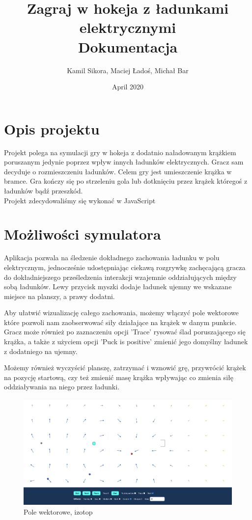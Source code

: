 \documentclass{article}
\title{ Zagraj w hokeja z ładunkami elektrycznymi \\
\large Dokumentacja}
\author{Kamil Sikora,
Maciej Ładoś,
Michał Bar}
\date{April 2020}
\begin{document}
\maketitle

\newpage
\tableofcontents

\newpage

\section{Opis projektu}
Projekt polega na symulacji gry w hokeja z dodatnio naładowanym krążkiem poruszanym jedynie poprzez wpływ innych ładunków elektrycznych. Gracz sam decyduje o rozmieszczeniu ładunków. Celem gry jest umieszczenie krążka w bramce. Gra kończy się po strzeleniu gola lub dotknięciu przez krążek któregoś z ładunków bądź przeszkód.\\
Projekt zdecydowaliśmy się wykonać w JavaScript

\section{Możliwości symulatora}

Aplikacja pozwala na śledzenie dokładnego zachowania ładunku w polu elektrycznym, jednocześnie udostępniając ciekawą rozgrywkę zachęcającą gracza do dokładniejszego prześledzenia interakcji wzajemnie oddziałujących między sobą ładunków. Lewy przycisk myszki dodaje ładunek ujemny we wskazane miejsce na planszy, a prawy dodatni.

Aby ułatwić wizualizację całego zachowania, możemy włączyć pole wektorowe które pozwoli nam zaobserwować siły działające na krążek w danym punkcie. Gracz może również po zaznaczeniu opcji 'Trace' rysować ślad poruszającego się krążka, a także z użyciem opcji 'Puck is positive' zmienić jego domyślny ładunek z dodatniego na ujemny.

Możemy również wyczyścić planszę, zatrzymać i wznowić grę, przywrócić krążek na pozycję startową, czy też zmienić masę krążka wpływając co zmienia siłę oddziaływania na niego przez ładunki.

\begin{figure}[H]
    \centering
    \includegraphics[width=\textwidth,height=\textheight,keepaspectratio]{img/field.png}
    \caption{Pole wektorowe, izotop}
    \label{fig:vector_drawing}
\end{figure}
\end{document}
